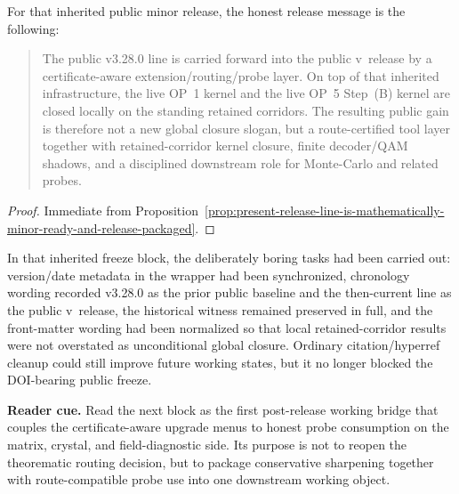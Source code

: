 \begin{corollary}
\label{cor:honest-public-release-message-for-the-present-minor-release}
For that inherited public minor release, the honest release message is the following:
\begin{quote}\small
The public v3.28.0 line is carried forward into the public v\docversion\ release by a certificate-aware extension/routing/probe layer. On top of that inherited infrastructure, the live OP~1 kernel and the live OP~5 Step~(B) kernel are closed locally on the standing retained corridors. The resulting public gain is therefore not a new global closure slogan, but a route-certified tool layer together with retained-corridor kernel closure, finite decoder/QAM shadows, and a disciplined downstream role for Monte-Carlo and related probes.
\end{quote}
\end{corollary}

\begin{proof}
Immediate from Proposition~\ref{prop:present-release-line-is-mathematically-minor-ready-and-release-packaged}.
\end{proof}

\begin{remark}
\label{rem:freeze-checklist-completed-for-the-doi-bearing-release}
In that inherited freeze block, the deliberately boring tasks had been carried out: version/date metadata in the wrapper had been synchronized, chronology wording recorded v3.28.0 as the prior public baseline and the then-current line as the public v\docversion\ release, the historical witness remained preserved in full, and the front-matter wording had been normalized so that local retained-corridor results were not overstated as unconditional global closure. Ordinary citation/hyperref cleanup could still improve future working states, but it no longer blocked the DOI-bearing public freeze.
\end{remark}


\noindent\textbf{Reader cue.} Read the next block as the first post-release working bridge that couples the certificate-aware upgrade menus to honest probe consumption on the matrix, crystal, and field-diagnostic side. Its purpose is not to reopen the theorematic routing decision, but to package conservative sharpening together with route-compatible probe use into one downstream working object.

